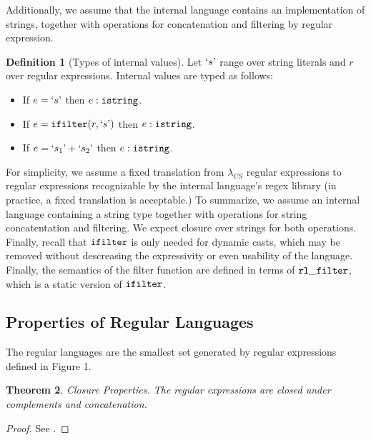 \documentclass[10pt,preprint]{sigplanconf}
\newtheorem{thm}{Theorem}
\theoremstyle{definition}
\newtheorem{defn}[thm]{Definition}
\newcommand{\istr}{ {\tt istring} }
\newcommand{\ifilter}[2]{ {\tt ifilter}(#1,#2) }
\newcommand{\istrf}[1]{`#1\textrm'} %
\newcommand{\lcs}{\lambda_{CS}}
\begin{document}
Additionally, we assume that the internal language contains an implementation of strings,
together with operations for concatenation and filtering by regular expression.

\begin{defn}[Types of internal values]
  Let $\istrf{s}$ range over string literals and $r$ over regular expressions.
  Internal values are typed as follows:
\begin{itemize}
  \item If $e=\istrf{s}$ then $e:\istr$.
  \item If $e=\ifilter{r}{\istrf{s}}$ then $e:\istr$.
  \item If $e=\istrf{s_1}+\istrf{s_2}$ then $e:\istr$.
\end{itemize}
\end{defn}

For simplicity, we assume a fixed translation from
$\lcs$ regular expressions to regular expressions recognizable by the internal
language's regex library (in practice, a fixed translation is acceptable.)
To summarize, we assume an internal language containing 
a string type together with operations for string concatentation and filtering. We
expect closure over strings for both operations.
Finally, recall that ${\tt ifilter}$ is only needed for dynamic casts, which may be removed without
descreasing the expressivity or even usability of the language.
Finally, the semantics of the filter function are defined in terms of ${\tt rl\_filter}$,
which is a static version of ${\tt ifilter}$.

\subsection{Properties of Regular Languages}

The regular languages are the smallest set generated by regular expressions
defined in Figure 1.

\begin{thm}{Closure Properties.} \label{thm:closure}
The regular expressions are closed under complements and concatenation.
\end{thm}
\begin{proof}
See \cite{cinderella}.
\end{proof}
\end{document}
